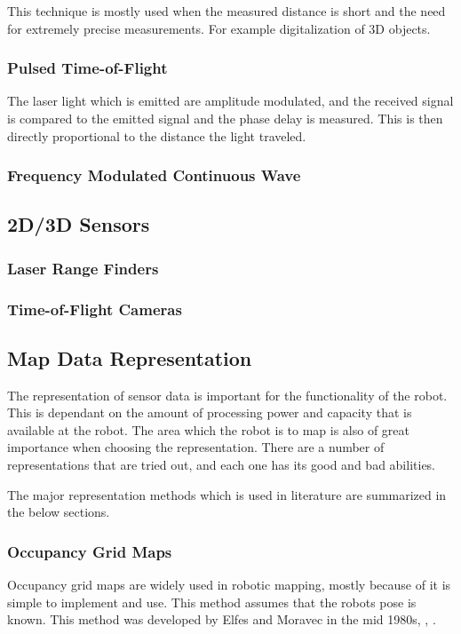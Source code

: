 This technique is mostly used when the measured distance is short and the need for
extremely precise measurements. For example digitalization of 3D objects.


\subsubsection{Pulsed Time-of-Flight}
The laser light which is emitted are amplitude modulated, and the received signal is
compared to the emitted signal and the phase delay is measured. This is then directly
proportional to the distance the light traveled. 


\subsubsection{Frequency Modulated Continuous Wave}



\subsection{2D/3D Sensors}



\subsubsection{Laser Range Finders}




\subsubsection{Time-of-Flight Cameras}




\subsection{Map Data Representation}
The representation of sensor data is important for the functionality of the robot. This is
dependant on the amount of processing power and capacity that is available at the robot.
The area which the robot is to map is also of great importance when choosing the
representation. There are a number of representations that are tried out, and each one has its good and
bad abilities. 

The major representation methods which is used in literature are summarized in the below
sections.


\subsubsection{Occupancy Grid Maps}
Occupancy grid maps are widely used in robotic mapping, mostly because of it is simple to
implement and use. This method assumes that the robots pose is known. This method was
developed by Elfes and Moravec in the mid 1980s, \cite{elfes}, \cite{moravec}.



